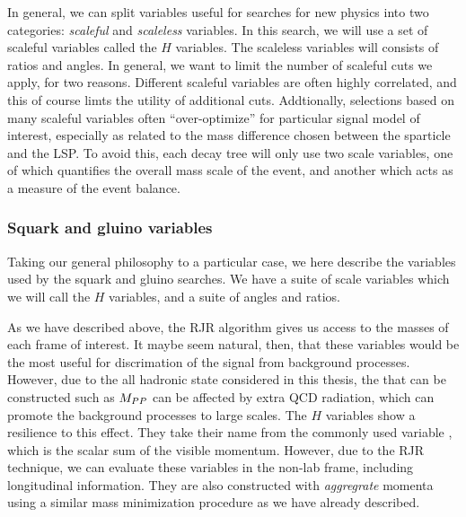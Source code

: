 In general, we can split variables useful for searches for new physics into two categories: \textit{scaleful} and \textit{scaleless} variables.
In this search, we will use a set of scaleful variables called the $H$ variables.
The scaleless variables will consists of ratios and angles.
In general, we want to limit the number of scaleful cuts we apply, for two reasons.
Different scaleful variables are often highly correlated, and this of course limts the utility of additional cuts.
Addtionally, selections based on many scaleful variables often ``over-optimize'' for particular signal model of interest, especially as related to the mass difference chosen between the sparticle and the LSP.
To avoid this, each decay tree will only use two scale variables, one of which quantifies the overall mass scale of the event, and another which acts as a measure of the event balance.

\subsubsection{Squark and gluino variables}

Taking our general philosophy to a particular case, we here describe the variables used by the squark and gluino searches.
We have a suite of scale variables which we will call the $H$ variables, and a suite of angles and ratios.

As we have described above, the RJR algorithm gives us access to the masses of each frame of interest.
It maybe seem natural, then, that these variables would be the most useful for discrimation of the signal from background processes.
However, due to the all hadronic state considered in this thesis, the that can be constructed such as $M_{PP}$ can be affected by extra QCD radiation, which can promote the background processes to large scales.
The $H$ variables show a resilience to this effect.
They take their name from the commonly used variable \HT, which is the scalar sum of the visible momentum.
However, due to the RJR technique, we can evaluate these variables in the non-lab frame, including longitudinal information.
They are also constructed with \textit{aggregrate} momenta using a similar mass minimization procedure as we have already described.

